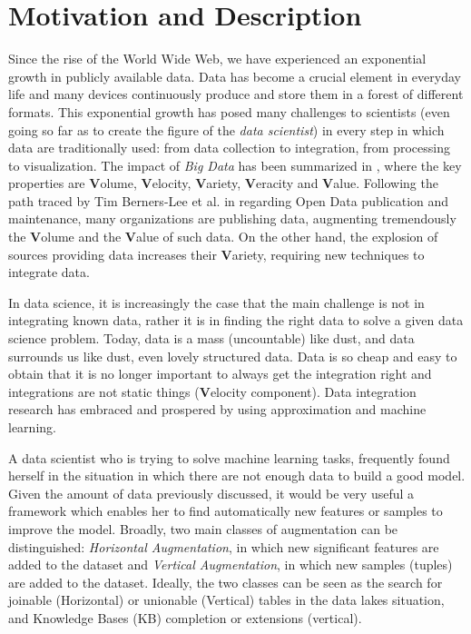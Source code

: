 \section{Motivation and Description}\label{motivations}

Since the rise of the World Wide Web, we have experienced an exponential growth in publicly available data. Data has become a crucial element in everyday life and many devices continuously produce and store them in a forest of different formats. This exponential growth has posed many challenges to scientists (even going so far as to create the figure of the \textit{data scientist}) in every step in which data are traditionally used: from data collection to integration, from processing to visualization. The impact of \textit{Big Data} has been summarized in \cite{mcafee2012big}, where the key properties are \textbf{V}olume, \textbf{V}elocity, \textbf{V}ariety, \textbf{V}eracity and \textbf{V}alue. Following the path traced by Tim Berners-Lee et al. in \cite{bizer2009linked} regarding Open Data publication and maintenance, many organizations are publishing data, augmenting tremendously the \textbf{V}olume and the \textbf{V}alue of such data. On the other hand, the explosion of sources providing data increases their \textbf{V}ariety, requiring new techniques to integrate data.

In data science, it is increasingly the case that the main challenge is not in integrating known data, rather it is in finding the right data to solve a given data science problem. Today, data is a mass (uncountable) like dust, and data surrounds us like dust, even lovely structured data. Data is so cheap and easy to obtain that it is no longer important to always get the integration right and integrations are not static things (\textbf{V}elocity component). Data integration research has embraced and prospered by using approximation and machine learning. 

A data scientist who is trying to solve machine learning tasks, frequently found herself in the situation in which there are not enough data to build a good model. Given the amount of data previously discussed, it would be very useful a framework which enables her to find automatically new features or samples to improve the model. Broadly, two main classes of augmentation can be distinguished: \textit{Horizontal Augmentation}, in which new significant features are added to the dataset and \textit{Vertical Augmentation}, in which new samples (tuples) are added to the dataset. Ideally, the two classes can be seen as the search for joinable (Horizontal) or unionable (Vertical) tables in the data lakes situation, and Knowledge Bases (KB) completion or extensions (vertical).

